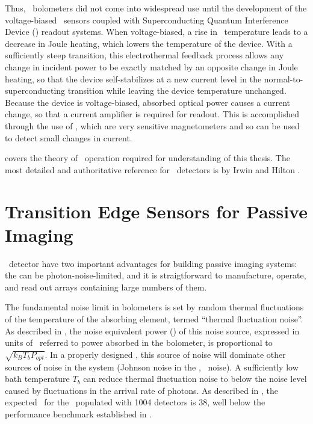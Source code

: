 Thus, \TES\ bolometers did not come into widespread use until the development of the voltage-biased \TES\ sensors \cite{irwin_application_1995} coupled with Superconducting Quantum Interference Device (\SQUID) readout systems.
When voltage-biased, a rise in \TES\ temperature leads to a decrease in Joule heating, which lowers the temperature of the device.
With a sufficiently steep transition, this electrothermal feedback process allows any change in incident power to be exactly matched by an opposite change in Joule heating, so that the device self-stabilizes at a new current level in the normal-to-superconducting transition while leaving the device temperature unchanged.
Because the device is voltage-biased, absorbed optical power causes a current change, so that a current amplifier is required for readout.
This is accomplished through the use of \SQUIDs, which are very sensitive magnetometers and so can be used to detect small changes in current.

 covers the theory of \TES\ operation required for understanding of this thesis.
The most detailed and authoritative reference for \TES\ detectors is by Irwin and Hilton \cite{irwin_transition-edge_2005}.

\section{Transition Edge Sensors for Passive Imaging} \label{sec:ch2-tes-passive}

\TES\ detector have two important advantages for building passive imaging systems: the can be photon-noise-limited, and it is straigtforward to manufacture, operate, and read out arrays containing large numbers of them.

The fundamental noise limit in bolometers is set by random thermal fluctuations of the temperature of the absorbing element, termed ``thermal fluctuation noise''.
As described in , the noise equivalent power (\NEP) of this noise source, expressed in units of \pnoise\ referred to power absorbed in the bolometer, is proportional to $\sqrt{k_B T_b P_{opt}}$.
In a properly designed \TES, this source of noise will dominate other sources of noise in the system (Johnson noise in the \TES, \SQUID\ noise).
A sufficiently low bath temperature $T_b$ can reduce thermal fluctuation noise to below the noise level caused by fluctuations in the arrival rate of photons.
As described in , the expected \NETD\ for the \Imager\ populated with 1004 detectors is \SI{38}{\mK}, well below the performance benchmark established in .

